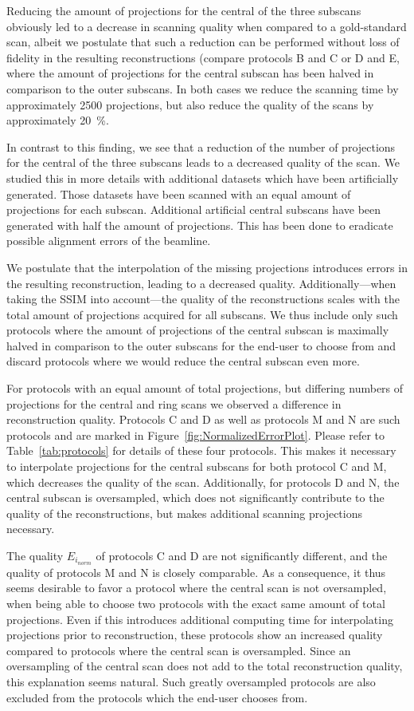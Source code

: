 Reducing the amount of projections for the central of the three subscans obviously led to a decrease in scanning quality when compared to a gold-standard scan, albeit we postulate that such a reduction can be performed without loss of fidelity in the resulting reconstructions (compare \eg  protocols B and C or D and E, where the amount of projections for the central subscan has been halved in comparison to the outer subscans. In both cases we reduce the scanning time by approximately 2500 projections, but also reduce the quality of the scans by approximately \SI{20}{\percent}.

In contrast to this finding, we see that a reduction of the number of projections for the central of the three subscans leads to a decreased quality of the scan. We studied this in more details with additional datasets which have been artificially generated. Those datasets have been scanned with an equal amount of projections for each subscan. Additional artificial central subscans have been generated with half the amount of projections. This has been done to eradicate possible alignment errors of the beamline.

We postulate that the interpolation of the missing projections introduces errors in the resulting reconstruction, leading to a decreased quality. Additionally---when taking the SSIM into account---the quality of the reconstructions scales with the total amount of projections acquired for all subscans. We thus include only such protocols where the amount of projections of the central subscan is maximally halved in comparison to the outer subscans for the end-user to choose from and discard protocols where we would reduce the central subscan even more.

For protocols with an equal amount of total projections, but differing numbers of projections for the central and ring scans we observed a difference in reconstruction quality. Protocols C and D as well as protocols M and N are such protocols and are marked in Figure~\ref{fig:NormalizedErrorPlot}. Please refer to Table~\ref{tab:protocols} for details of these four protocols. This makes it necessary to interpolate projections for the central subscans for both protocol C and M, which decreases the quality of the scan. Additionally, for protocols D and N, the central subscan is oversampled, which does not significantly contribute to the quality of the reconstructions, but makes additional scanning projections necessary. 

The quality $E_{i_{norm}}$ of protocols C and D are not significantly different, and the quality of protocols M and N is closely comparable. As a consequence, it thus seems desirable to favor a protocol where the central scan is not oversampled, when being able to choose two protocols with the exact same amount of total projections. Even if this introduces additional computing time for interpolating projections prior to reconstruction, these protocols show an increased quality compared to protocols where the central scan is oversampled. Since an oversampling of the central scan does not add to the total reconstruction quality, this explanation seems natural. Such greatly oversampled protocols are also excluded from the protocols which the end-user chooses from.

